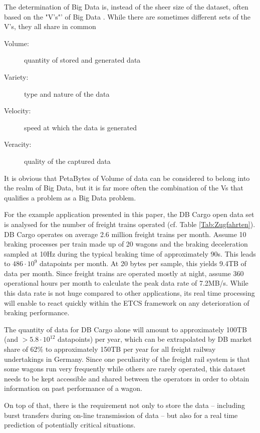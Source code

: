 \documentclass[a4paper, 12pt]{scrartcl}
\begin{document}
The determination of Big Data is, instead of the sheer size of the dataset, often based on the "V's"' of Big Data \cite{hilbert2016big}. While there are sometimes different sets of the V's, they all share in common
\begin{description}
	\item[Volume:] quantity of stored and generated data 
	\item[Variety:] type and nature of the data
	\item[Velocity:] speed at which the data is generated
	\item[Veracity:] quality of the captured data
\end{description}
It is obvious that PetaBytes of Volume of data can be considered to belong into the realm of Big Data, but it is far more often the combination of the Vs that qualifies a problem as a Big Data problem.

For the example application presented in this paper, the DB Cargo open data set \cite{DBOpenDataZug} is analysed for the number of freight trains operated (cf. Table \ref{Tab:Zugfahrten}). DB Cargo operates on average 2.6 million freight trains per month. Assume 10 braking processes per train made up of 20 wagons and the braking deceleration sampled at 10Hz during the typical braking time of approximately 90s. This leads to $486\cdot 10^9$ datapoints per month. At 20 bytes per sample, this yields 9.4TB of data per month. Since freight trains are operated mostly at night, assume 360 operational hours per month to calculate the peak data rate of 7.2MB/s. While this data rate is not huge compared to other applications, its real time processing will enable to react quickly within the ETCS framework on any deterioration of braking performance.

The quantity of data for DB Cargo alone will amount to approximately 100TB (and $>5.8\cdot 10^{12}$ datapoints) per year, which can be extrapolated by DB market share of 62\% to approximately 150TB per year for all freight railway undertakings in Germany. Since one peculiarity of the freight rail system is that some wagons run very frequently while others are rarely operated, this dataset needs to be kept accessible and shared between the operators in order to obtain  information on past performance of a wagon.

On top of that, there is the requirement not only to store the data -- including burst transfers during on-line transmission of data -- but also for a real time prediction of potentially critical situations.
\end{document}
